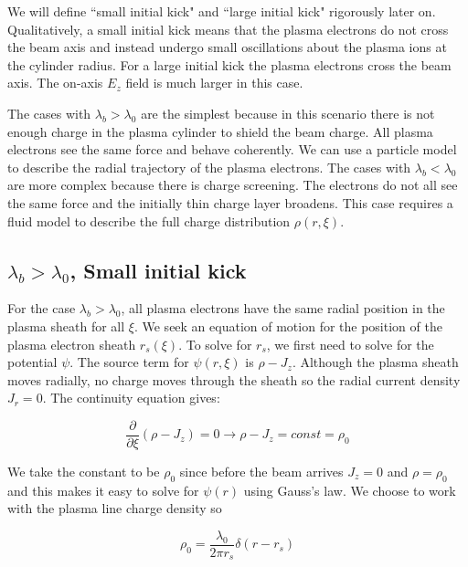 \documentclass[aps,prl,preprint,groupedaddress]{revtex4-1}
\begin{document}
We will define ``small initial kick" and ``large initial kick" rigorously later on. Qualitatively, a small initial kick means that the plasma electrons do not cross the beam axis and instead undergo small oscillations about the plasma ions at the cylinder radius. For a large initial kick the plasma electrons cross the beam axis. The on-axis $E_z$ field is much larger in this case.

The cases with $\lambda_b > \lambda_0$ are the simplest because in this scenario there is not enough charge in the plasma cylinder to shield the beam charge. All plasma electrons see the same force and behave coherently. We can use a particle model to describe the radial trajectory of the plasma electrons. The cases with $\lambda_b < \lambda_0$ are more complex because there is charge screening. The electrons do not all see the same force and the initially thin charge layer broadens. This case requires a fluid model to describe the full charge distribution $\rho(r,\xi)$.







\subsection{$\lambda_b > \lambda_0$, Small initial kick}

For the case $\lambda_b > \lambda_0$, all plasma electrons have the same radial position in the plasma sheath for all $\xi$. We seek an equation of motion for the position of the plasma electron sheath $r_s(\xi)$. To solve for $r_s$, we first need to solve for the potential $\psi$. The source term for $\psi(r,\xi)$ is $\rho - J_z$. Although the plasma sheath moves radially, no charge moves through the sheath so the radial current density $J_r = 0$. The continuity equation gives:

\begin{equation}\label{eq:cont2}
\frac{\partial}{\partial \xi}(\rho - J_z) = 0 \rightarrow \rho - J_z = const = \rho_0 
\end{equation}

We take the constant to be $\rho_0$ since before the beam arrives $J_z = 0$ and $\rho = \rho_0$ and this makes it easy to solve for $\psi(r)$ using Gauss's law. We choose to work with the plasma line charge density so

\begin{equation}\label{eq:rho_for_lamb}
\rho_0 = \frac{\lambda_0}{2 \pi r_s}\delta(r - r_s)
\end{equation}
\end{document}
